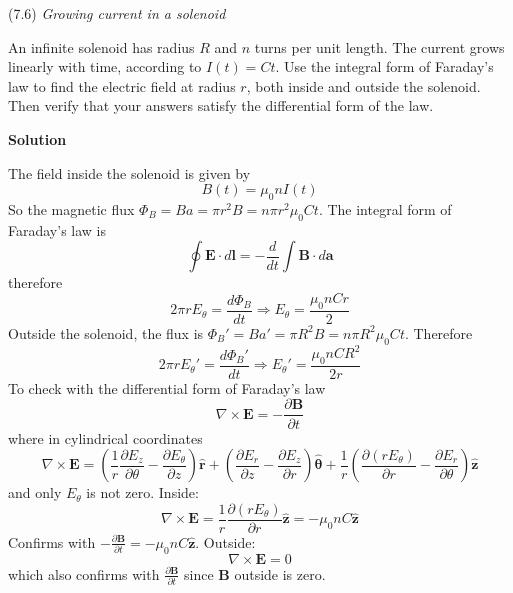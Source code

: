 \documentclass{article}
\begin{document}
\begin{homeworkProblem}
	(7.6) \textit{Growing current in a solenoid}

	An infinite solenoid has radius $R$ and $n$ turns per unit length. The current grows linearly with time, according to $I(t)=Ct$. Use the integral form of Faraday's law to find the electric field at radius $r$, both inside and outside the solenoid. Then verify that your answers satisfy the differential form of the law.

	\textbf{Solution}

	The field inside the solenoid is given by
	\[
		B(t)=\mu_0 n I(t)
	\]
	So the magnetic flux $\Phi_B=Ba=\pi r^2B=n\pi r^2\mu_0Ct$. The integral form of Faraday's law is
	\[
		\oint\mathbf{E}\cdot d\mathbf{l}=-\frac{d}{dt}\int\mathbf{B}\cdot d\mathbf{a}
	\]
	therefore
	\[
		2\pi rE_\theta=\frac{d\Phi_B}{dt}\Longrightarrow E_\theta=\frac{\mu_0 nCr}{2}
	\]
	Outside the solenoid, the flux is ${\Phi_B}'=Ba'=\pi R^2B=n\pi R^2\mu_0Ct$. Therefore
	\[
		2\pi r{E_\theta}'=\frac{d{\Phi_B}'}{dt}\Longrightarrow {E_\theta}'=\frac{\mu_0 nCR^2}{2r}
	\]
	To check with the differential form of Faraday's law
	\[
		\nabla\times\mathbf{E}=-\frac{\partial\mathbf{B}}{\partial t}
	\]
	where in cylindrical coordinates
	\[
		\nabla\times\mathbf{E}=\left({\frac{1}{r}}{\frac{\partial E_{z}}{\partial\theta}}-{\frac{\partial E_{\theta}}{\partial z}}\right){\mathbf{{\hat{r}}}}+\left({\frac{\partial E_r}{\partial z}}-{\frac{\partial E_z}{\partial r}}\right){\boldsymbol{{\hat{\theta}}}}+{\frac{1}{r}}\left({\frac{\partial\left(r E_{\theta}\right)}{\partial r}}-{\frac{\partial E_r}{\partial\theta}}\right){\mathbf{\hat{z}}}
	\]
	and only $E_\theta$ is not zero. Inside:
	\[
		\nabla\times\mathbf{E}=\frac{1}{r}{\frac{\partial\left(r E_{\theta}\right)}{\partial r}}{\mathbf{\hat{z}}}=-\mu_0nC{\mathbf{\hat{z}}}
	\]
	Confirms with $-\frac{\partial\mathbf{B}}{\partial t}=-\mu_0nC{\mathbf{\hat{z}}}$. Outside:
	\[
		\nabla\times\mathbf{E}=0
	\]
	which also confirms with $\frac{\partial\mathbf{B}}{\partial t}$ since $\mathbf{B}$ outside is zero.
\end{homeworkProblem}

\end{document}

